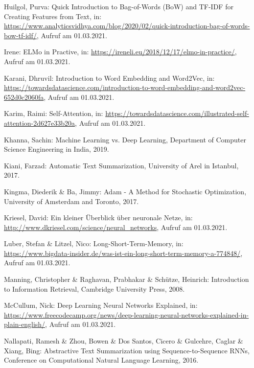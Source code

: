 \begin{thebibliography}{50}
Huilgol, Purva: Quick Introduction to Bag-of-Words (BoW) and TF-IDF for Creating Features from Text, in: \url{https://www.analyticsvidhya.com/blog/2020/02/quick-introduction-bag-of-words-bow-tf-idf/}, Aufruf am 01.03.2021.

Irene: ELMo in Practive, in: \url{https://ireneli.eu/2018/12/17/elmo-in-practice/}, Aufruf am 01.03.2021.

Karani, Dhruvil: Introduction to Word Embedding and Word2Vec, in: \url{https://towardsdatascience.com/introduction-to-word-embedding-and-word2vec-652d0c2060fa}, Aufruf am 01.03.2021.

Karim, Raimi: Self-Attention, in: \url{https://towardsdatascience.com/illustrated-self-attention-2d627e33b20a}, Aufruf am 01.03.2021.

Khanna, Sachin: Machine Learning vs. Deep Learning, Department of Computer Science Engineering in India, 2019.

Kiani, Farzad: Automatic Text Summarization, University of Arel in Istanbul, 2017.

Kingma, Diederik \& Ba, Jimmy: Adam - A Method for Stochastic Optimization, University of Amsterdam and Toronto, 2017.

Kriesel, David: Ein kleiner Überblick über neuronale Netze, in: \url{http://www.dkriesel.com/science/neural_networks}, Aufruf am 01.03.2021.

Luber, Stefan \& Litzel, Nico: Long-Short-Term-Memory, in: \url{https://www.bigdata-insider.de/was-ist-ein-long-short-term-memory-a-774848/}, Aufruf am 01.03.2021.

Manning, Christopher \& Raghavan, Prabhakar \& Schütze, Heinrich: Introduction to Information Retrieval, Cambridge University Press, 2008.

McCullum, Nick: Deep Learning Neural Networks Explained, in: \url{https://www.freecodecamp.org/news/deep-learning-neural-networks-explained-in-plain-english/}, Aufruf am 01.03.2021.

Nallapati, Ramesh \& Zhou, Bowen \& Dos Santos, Cicero \& Gulcehre, Caglar \& Xiang, Bing: Abstractive Text Summarization using Sequence-to-Sequence RNNs, Conference on Computational Natural Language Learning, 2016.


\end{thebibliography}
